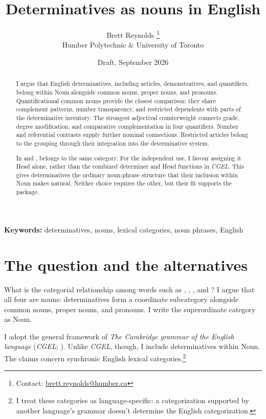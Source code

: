 \documentclass[12pt]{article}
\title{Determinatives as nouns in English}
\author{Brett Reynolds \orcidlink{0000-0003-0073-7195}%
\thanks{Contact: \href{mailto:brett.reynolds@humber.ca}{brett.reynolds@humber.ca}}\\
Humber Polytechnic \& University of Toronto}
\date{Draft, September 2026}
\begin{document}
\maketitle

\begin{abstract}
I argue that English determinatives, including articles, demonstratives, and quantifiers, belong within Noun alongside common nouns, proper nouns, and pronouns. Quantificational common nouns provide the closest comparison: they share complement patterns, number transparency, and restricted dependents with parts of the determinative inventory. The strongest adjectival counterweight connects grade, degree modification, and comparative complementation in four quantifiers. Number and referential contrasts supply further nominal connections. Restricted articles belong to the grouping through their integration into the determinative system.

In  and ,  belongs to the same category. For the independent use, I favour assigning it Head alone, rather than the combined determiner and Head functions in \textit{CGEL}. This gives determinatives the ordinary noun-phrase structure that their inclusion within Noun makes natural. Neither choice requires the other, but their fit supports the package.
\end{abstract}

\noindent\textbf{Keywords:} determinatives, nouns, lexical categories, noun phrases, English

\section{The question and the alternatives}\label{sec:intro}

What is the categorial relationship among words such as , , , and ? I argue that all four are nouns: determinatives form a coordinate subcategory alongside common nouns, proper nouns, and pronouns. I write the superordinate category as Noun.

I adopt the general framework of \textit{The Cambridge grammar of the English language} (\textit{CGEL}; \citealt{huddleston2002}). Unlike \textit{CGEL}, though, I include determinatives within Noun. The claims concern synchronic English lexical categories.\footnote{I treat these categories as language-specific: a categorization supported by another language's grammar doesn't determine the English categorization.}
\end{document}
